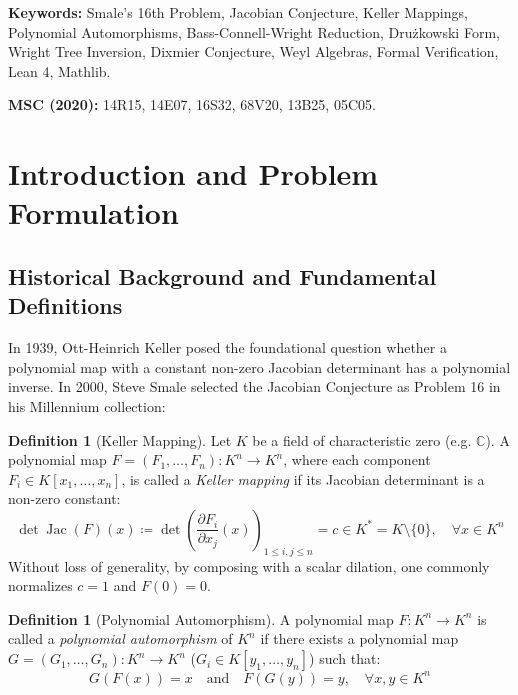 \documentclass[11pt,a4paper]{article}
\theoremstyle{definition}
\newtheorem{definition}[theorem]{Definition}
\begin{document}
\vspace{0.5em}
\noindent\textbf{Keywords:} Smale's 16th Problem, Jacobian Conjecture, Keller Mappings, Polynomial Automorphisms, Bass-Connell-Wright Reduction, Drużkowski Form, Wright Tree Inversion, Dixmier Conjecture, Weyl Algebras, Formal Verification, Lean 4, Mathlib.

\noindent\textbf{MSC (2020):} 14R15, 14E07, 16S32, 68V20, 13B25, 05C05.

\tableofcontents
\newpage

\section{Introduction and Problem Formulation}

\subsection{Historical Background and Fundamental Definitions}
In 1939, Ott-Heinrich Keller \cite{keller1939} posed the foundational question whether a polynomial map with a constant non-zero Jacobian determinant has a polynomial inverse.
In 2000, Steve Smale \cite{smale2000} selected the Jacobian Conjecture as Problem 16 in his Millennium collection:

\begin{definition}[Keller Mapping]\label{def:keller_map}
Let $K$ be a field of characteristic zero (e.g. $\mathbb{C}$). A polynomial map $F = (F_1, \dots, F_n): K^n \to K^n$, where each component $F_i \in K[x_1, \dots, x_n]$, is called a \emph{Keller mapping} if its Jacobian determinant is a non-zero constant:
\begin{equation}\label{eq:keller_condition}
\det \operatorname{Jac}(F)(x) \coloneqq \det \left( \frac{\partial F_i}{\partial x_j}(x) \right)_{1 \le i, j \le n} = c \in K^* = K \setminus \{0\}, \quad \forall x \in K^n
\end{equation}
Without loss of generality, by composing with a scalar dilation, one commonly normalizes $c = 1$ and $F(0) = 0$.
\end{definition}

\begin{definition}[Polynomial Automorphism]\label{def:poly_automorphism}
A polynomial map $F: K^n \to K^n$ is called a \emph{polynomial automorphism} of $K^n$ if there exists a polynomial map $G = (G_1, \dots, G_n): K^n \to K^n$ ($G_i \in K[y_1, \dots, y_n]$) such that:
\begin{equation}\label{eq:bilateral_inverse}
G(F(x)) = x \quad \text{and} \quad F(G(y)) = y, \quad \forall x, y \in K^n
\end{equation}
\end{definition}
\end{document}
